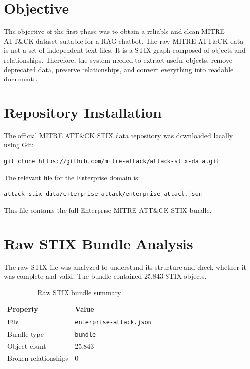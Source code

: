 \documentclass[12pt,a4paper]{report}
\newcommand{\ATTACK}{MITRE ATT\&CK}
\begin{document}
\section{Objective}

The objective of the first phase was to obtain a reliable and clean \ATTACK{} dataset suitable for a RAG chatbot. The raw \ATTACK{} data is not a set of independent text files. It is a STIX graph composed of objects and relationships. Therefore, the system needed to extract useful objects, remove deprecated data, preserve relationships, and convert everything into readable documents.

\section{Repository Installation}

The official \ATTACK{} STIX data repository was downloaded locally using Git:

\begin{lstlisting}[style=bashstyle]
git clone https://github.com/mitre-attack/attack-stix-data.git
\end{lstlisting}

The relevant file for the Enterprise domain is:

\begin{lstlisting}[style=bashstyle]
attack-stix-data/enterprise-attack/enterprise-attack.json
\end{lstlisting}

This file contains the full Enterprise \ATTACK{} STIX bundle.

\section{Raw STIX Bundle Analysis}

The raw STIX file was analyzed to understand its structure and check whether it was complete and valid. The bundle contained 25,843 STIX objects.

\begin{table}[H]
\centering
\begin{tabular}{ll}
\toprule
\textbf{Property} & \textbf{Value} \\
\midrule
File & \texttt{enterprise-attack.json} \\
Bundle type & \texttt{bundle} \\
Object count & 25,843 \\
Broken relationships & 0 \\
\bottomrule
\end{tabular}
\caption{Raw STIX bundle summary}
\end{table}
\end{document}
